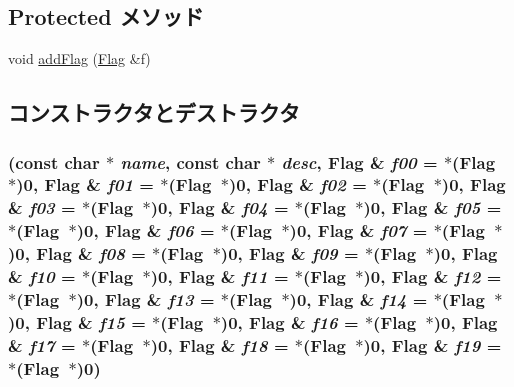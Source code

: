 \subsection*{Protected メソッド}
\begin{DoxyCompactItemize}
\item 
void \hyperlink{classDebug_1_1CompoundFlag_a667690869b46bb35864d6169181e3b60}{addFlag} (\hyperlink{classDebug_1_1Flag}{Flag} \&f)
\end{DoxyCompactItemize}


\subsection{コンストラクタとデストラクタ}
\hypertarget{classDebug_1_1CompoundFlag_ab5d2bb6f27100008c07c280759bb2340}{
\subsubsection[{CompoundFlag}]{ (const char $\ast$ {\em name}, \/  const char $\ast$ {\em desc}, \/  {\bf Flag} \& {\em f00} = {\ttfamily $\ast$({\bf Flag}~$\ast$)0}, \/  {\bf Flag} \& {\em f01} = {\ttfamily $\ast$({\bf Flag}~$\ast$)0}, \/  {\bf Flag} \& {\em f02} = {\ttfamily $\ast$({\bf Flag}~$\ast$)0}, \/  {\bf Flag} \& {\em f03} = {\ttfamily $\ast$({\bf Flag}~$\ast$)0}, \/  {\bf Flag} \& {\em f04} = {\ttfamily $\ast$({\bf Flag}~$\ast$)0}, \/  {\bf Flag} \& {\em f05} = {\ttfamily $\ast$({\bf Flag}~$\ast$)0}, \/  {\bf Flag} \& {\em f06} = {\ttfamily $\ast$({\bf Flag}~$\ast$)0}, \/  {\bf Flag} \& {\em f07} = {\ttfamily $\ast$({\bf Flag}~$\ast$)0}, \/  {\bf Flag} \& {\em f08} = {\ttfamily $\ast$({\bf Flag}~$\ast$)0}, \/  {\bf Flag} \& {\em f09} = {\ttfamily $\ast$({\bf Flag}~$\ast$)0}, \/  {\bf Flag} \& {\em f10} = {\ttfamily $\ast$({\bf Flag}~$\ast$)0}, \/  {\bf Flag} \& {\em f11} = {\ttfamily $\ast$({\bf Flag}~$\ast$)0}, \/  {\bf Flag} \& {\em f12} = {\ttfamily $\ast$({\bf Flag}~$\ast$)0}, \/  {\bf Flag} \& {\em f13} = {\ttfamily $\ast$({\bf Flag}~$\ast$)0}, \/  {\bf Flag} \& {\em f14} = {\ttfamily $\ast$({\bf Flag}~$\ast$)0}, \/  {\bf Flag} \& {\em f15} = {\ttfamily $\ast$({\bf Flag}~$\ast$)0}, \/  {\bf Flag} \& {\em f16} = {\ttfamily $\ast$({\bf Flag}~$\ast$)0}, \/  {\bf Flag} \& {\em f17} = {\ttfamily $\ast$({\bf Flag}~$\ast$)0}, \/  {\bf Flag} \& {\em f18} = {\ttfamily $\ast$({\bf Flag}~$\ast$)0}, \/  {\bf Flag} \& {\em f19} = {\ttfamily $\ast$({\bf Flag}~$\ast$)0})}}
\label{classDebug_1_1CompoundFlag_ab5d2bb6f27100008c07c280759bb2340}



